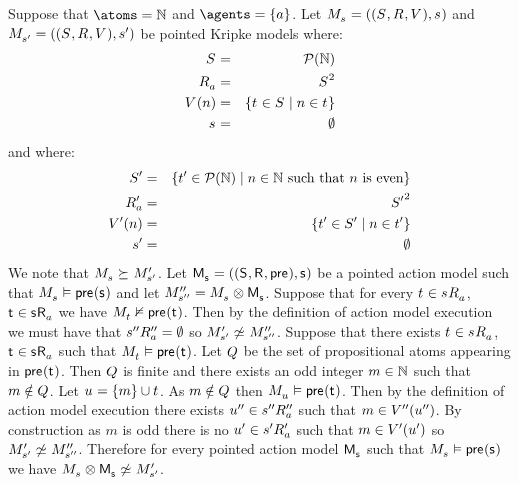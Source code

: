 \begin{example}
Suppose that $\atoms = \naturals$ and $\agents = \{\agentA\}$.
Let $\kPModelAndTuple{\kStateS}$ and $\kPModelAndTuple{\kStateSP}$ be pointed Kripke models where:
\begin{eqnarray*}
    \kStates &=& \powerset(\naturals)\\
    \kAccessibilityA &=& \kStates^2\\
    \kValuation(n) &=& \{\kStateT \in \kStates \mid n \in \kStateT\}\\
    \kStateS &=& \emptyset
\end{eqnarray*}
and where:
\begin{eqnarray*}
    {S^{\prime}} &=& \{{t}^{\prime} \in \mathcal{P}(\mathbb{N}) \mid n \in \mathbb{N} \text{ such that } n \text{ is even}\}\\
    {R^{\prime}_{a}} &=& {S^{\prime}}^2\\
    {V^{\prime}}(n) &=& \{{t}^{\prime} \in {S^{\prime}} \mid n \in {t}^{\prime}\}\\
    {s}^{\prime} &=& \emptyset
\end{eqnarray*}
We note that $\kPModel{\kStateS} \simulates \kPModelP{\kStateSP}$.
Let $\aPModelAndTuple{\aStateS}$ be a pointed action model such that $\kPModel{\kStateS} \entails \aPrecondition(\aStateS)$ and let $\kPModelPP{\kStateSPP} = \kPModel{\kStateS} \exec \aPModel{\aStateS}$.
Suppose that for every $\kStateT \in \kSuccessorsA{\kStateS}$, $\aStateT \in \aSuccessorsA{\aStateS}$ we have $\kPModel{\kStateT} \nentails \aPrecondition(\aStateT)$.
Then by the definition of action model execution we must have that ${{s}^{\prime\prime}} {R^{\prime\prime}_{a}} = \emptyset$ so $\kPModelP{\kStateSP} \not\bisimilar \kPModelPP{\kStateSPP}$.
Suppose that there exists $\kStateT \in \kSuccessorsA{\kStateS}$, $\aStateT \in \aSuccessorsA{\aStateS}$ such that $\kPModel{\kStateT} \entails \aPrecondition(\aStateT)$.
Let $Q$ be the set of propositional atoms appearing in $\aPrecondition(\aStateT)$.
Then $Q$ is finite and there exists an odd integer $m \in \mathbb{N}$ such that $m \notin Q$.
Let $\kStateU = \{m\} \cup \kStateT$.
As $m \notin Q$ then $\kPModel{\kStateU} \entails \aPrecondition(\aStateT)$.
Then by the definition of action model execution there exists ${u}^{\prime\prime} \in {{s}^{\prime\prime}} {R^{\prime\prime}_{a}}$ such that $m \in {V^{\prime\prime}}({u}^{\prime\prime})$.
By construction as $m$ is odd there is no ${u}^{\prime} \in {{s}^{\prime}} {R^{\prime}_{a}}$ such that $m \in {V^{\prime}}({u}^{\prime})$ so $\kPModelP{\kStateSP} \not\bisimilar \kPModelPP{\kStateSPP}$.
Therefore for every pointed action model $\aPModel{\aStateS}$ such that $\kPModel{\kStateS} \entails \aPrecondition(\aStateS)$ we have $\kPModel{\kStateS} \exec \aPModel{\aStateS} \not\bisimilar \kPModelP{\kStateSP}$.
\end{example}

